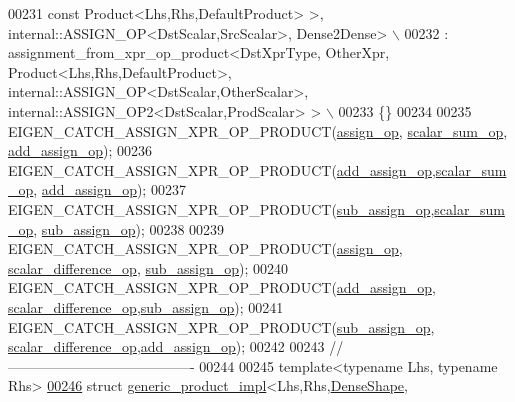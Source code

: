 \begin{DoxyCode}
00231 \textcolor{preprocessor}{                                            const Product<Lhs,Rhs,DefaultProduct> >,
       internal::ASSIGN\_OP<DstScalar,SrcScalar>, Dense2Dense> \(\backslash\)}
00232 \textcolor{preprocessor}{    : assignment\_from\_xpr\_op\_product<DstXprType, OtherXpr, Product<Lhs,Rhs,DefaultProduct>,
       internal::ASSIGN\_OP<DstScalar,OtherScalar>, internal::ASSIGN\_OP2<DstScalar,ProdScalar> > \(\backslash\)}
00233 \textcolor{preprocessor}{  \{\}}
00234 
00235 EIGEN\_CATCH\_ASSIGN\_XPR\_OP\_PRODUCT(\hyperlink{struct_eigen_1_1internal_1_1assign__op}{assign\_op},    \hyperlink{struct_eigen_1_1internal_1_1scalar__sum__op}{scalar\_sum\_op},
      \hyperlink{struct_eigen_1_1internal_1_1add__assign__op}{add\_assign\_op});
00236 EIGEN\_CATCH\_ASSIGN\_XPR\_OP\_PRODUCT(\hyperlink{struct_eigen_1_1internal_1_1add__assign__op}{add\_assign\_op},\hyperlink{struct_eigen_1_1internal_1_1scalar__sum__op}{scalar\_sum\_op},
      \hyperlink{struct_eigen_1_1internal_1_1add__assign__op}{add\_assign\_op});
00237 EIGEN\_CATCH\_ASSIGN\_XPR\_OP\_PRODUCT(\hyperlink{struct_eigen_1_1internal_1_1sub__assign__op}{sub\_assign\_op},\hyperlink{struct_eigen_1_1internal_1_1scalar__sum__op}{scalar\_sum\_op},
      \hyperlink{struct_eigen_1_1internal_1_1sub__assign__op}{sub\_assign\_op});
00238 
00239 EIGEN\_CATCH\_ASSIGN\_XPR\_OP\_PRODUCT(\hyperlink{struct_eigen_1_1internal_1_1assign__op}{assign\_op},    \hyperlink{struct_eigen_1_1internal_1_1scalar__difference__op}{scalar\_difference\_op},
      \hyperlink{struct_eigen_1_1internal_1_1sub__assign__op}{sub\_assign\_op});
00240 EIGEN\_CATCH\_ASSIGN\_XPR\_OP\_PRODUCT(\hyperlink{struct_eigen_1_1internal_1_1add__assign__op}{add\_assign\_op},
      \hyperlink{struct_eigen_1_1internal_1_1scalar__difference__op}{scalar\_difference\_op},\hyperlink{struct_eigen_1_1internal_1_1sub__assign__op}{sub\_assign\_op});
00241 EIGEN\_CATCH\_ASSIGN\_XPR\_OP\_PRODUCT(\hyperlink{struct_eigen_1_1internal_1_1sub__assign__op}{sub\_assign\_op},
      \hyperlink{struct_eigen_1_1internal_1_1scalar__difference__op}{scalar\_difference\_op},\hyperlink{struct_eigen_1_1internal_1_1add__assign__op}{add\_assign\_op});
00242 
00243 \textcolor{comment}{//----------------------------------------}
00244 
00245 \textcolor{keyword}{template}<\textcolor{keyword}{typename} Lhs, \textcolor{keyword}{typename} Rhs>
\hyperlink{struct_eigen_1_1internal_1_1generic__product__impl_3_01_lhs_00_01_rhs_00_01_dense_shape_00_01_dea94f9499d65c14b4f0b179cda95872e3}{00246} \textcolor{keyword}{struct }\hyperlink{struct_eigen_1_1internal_1_1generic__product__impl}{generic\_product\_impl}<Lhs,Rhs,\hyperlink{struct_eigen_1_1_dense_shape}{DenseShape},

\end{DoxyCode}
